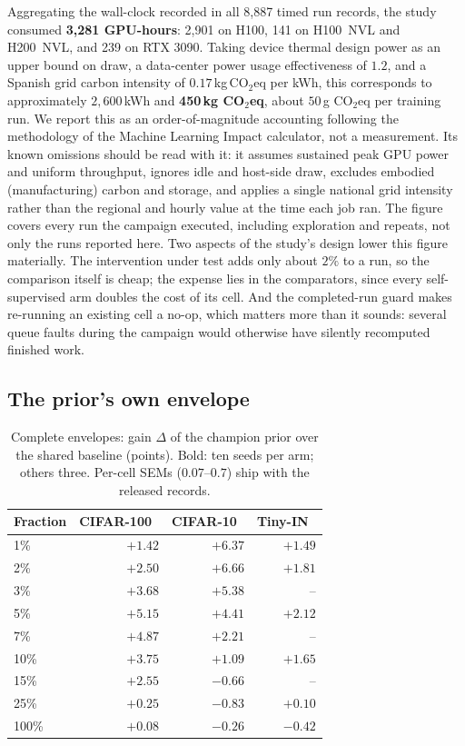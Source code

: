 Aggregating the wall-clock recorded in all 8{,}887 timed run records, the
study consumed \textbf{3{,}281 GPU-hours}: 2{,}901 on H100, 141 on H100~NVL and
H200~NVL, and 239 on RTX 3090. Taking device thermal design power as an
upper bound on draw, a data-center power usage effectiveness of $1.2$, and
a Spanish grid carbon intensity of $0.17$\,kg\,CO$_2$eq per kWh, this
corresponds to approximately $2{,}600$\,kWh and \textbf{450\,kg
CO$_2$eq}, about $50$\,g CO$_2$eq per training run. We report this as an
order-of-magnitude accounting following the methodology of the Machine
Learning Impact calculator, not a
measurement. Its known omissions should be read with it: it assumes
sustained peak GPU power and uniform throughput, ignores idle and host-side
draw, excludes embodied (manufacturing) carbon and storage, and applies a
single national grid intensity rather than the regional and hourly value at
the time each job ran. The figure covers every run the campaign executed,
including exploration and repeats, not only the runs reported here. Two aspects of the study's design lower
this figure materially. The intervention under test adds only about $2\%$
to a run, so the comparison itself is cheap; the expense lies in the
comparators, since every self-supervised arm doubles the cost of its cell.
And the completed-run guard makes re-running an existing cell a no-op,
which matters more than it sounds: several queue faults during the
campaign would otherwise have silently recomputed finished work.

\subsection{The prior's own envelope}\label{sec:ownenvelope}
\begin{table}[t]
\caption{Complete envelopes: gain $\Delta$ of the champion prior over the
shared baseline (points). Bold: ten seeds per arm; others three. Per-cell
SEMs ($0.07$--$0.7$) ship with the released records.}
\label{tab:envelope}
\centering\scriptsize
\setlength{\tabcolsep}{2.6pt}
\begin{tabular}{@{}lrrr@{}}
\toprule
Fraction & CIFAR-100~\up & CIFAR-10~\up & Tiny-IN~\up \\
\midrule
1\%   & $\mathbf{+1.42}$ & $\mathbf{+6.37}$ & $+1.49$ \\
2\%   & $+2.50$          & $\mathbf{+6.66}$ & $+1.81$ \\
3\%   & $+3.68$          & $+5.38$          &-- \\
5\%   & $\mathbf{+5.15}$ & $+4.41$          & $\mathbf{+2.12}$ \\
7\%   & $+4.87$          & $+2.21$          &-- \\
10\%  & $\mathbf{+3.75}$ & $+1.09$          & $+1.65$ \\
15\%  & $+2.55$          & $-0.66$          &-- \\
25\%  & $+0.25$          & $-0.83$          & $+0.10$ \\
100\% & $+0.08$          & $-0.26$          & $-0.42$ \\
\bottomrule
\end{tabular}
\end{table}

